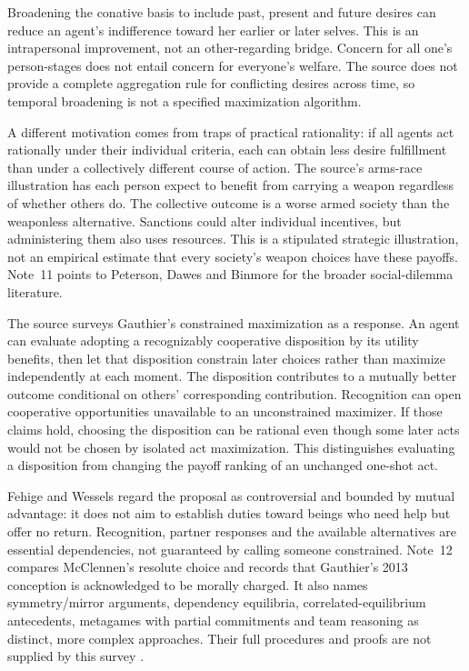 Broadening the conative basis to include past, present and future
desires can reduce an agent's indifference toward her earlier or
later selves. This is an intrapersonal improvement, not an
other-regarding bridge. Concern for all one's person-stages does
not entail concern for everyone's welfare. The source does not
provide a complete aggregation rule for conflicting desires across
time, so temporal broadening is not a specified maximization algorithm.

A different motivation comes from traps of practical rationality:
if all agents act rationally under their individual criteria, each
can obtain less desire fulfillment than under a collectively different
course of action. The source's arms-race illustration has each person
expect to benefit from carrying a weapon regardless of whether others
do. The collective outcome is a worse armed society than the
weaponless alternative. Sanctions could alter individual incentives,
but administering them also uses resources. This is a stipulated
strategic illustration, not an empirical estimate that every society's
weapon choices have these payoffs. Note~11 points to Peterson,
Dawes and Binmore for the broader social-dilemma literature.

The source surveys Gauthier's constrained maximization as a response.
An agent can evaluate adopting a recognizably cooperative disposition
by its utility benefits, then let that disposition constrain later
choices rather than maximize independently at each moment. The
disposition contributes to a mutually better outcome conditional on
others' corresponding contribution. Recognition can open cooperative
opportunities unavailable to an unconstrained maximizer. If those
claims hold, choosing the disposition can be rational even though
some later acts would not be chosen by isolated act maximization.
This distinguishes evaluating a disposition from changing the payoff
ranking of an unchanged one-shot act.

Fehige and Wessels regard the proposal as controversial and bounded
by mutual advantage: it does not aim to establish duties toward
beings who need help but offer no return. Recognition, partner
responses and the available alternatives are essential dependencies,
not guaranteed by calling someone constrained. Note~12 compares
McClennen's resolute choice and records that Gauthier's 2013 conception
is acknowledged to be morally charged. It also names symmetry/mirror
arguments, dependency equilibria, correlated-equilibrium antecedents,
metagames with partial commitments and team reasoning as distinct,
more complex approaches. Their full procedures and proofs are not
supplied by this survey \parencite[pp.~685--686 and nn.~11--12]{FehigeWessels2021Morality}.


